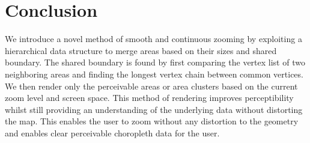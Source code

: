 
\section{Conclusion}
We introduce a novel method of smooth and continuous zooming by exploiting a hierarchical data structure to merge areas based on their sizes and shared boundary. The shared boundary is found by first comparing the vertex list of two neighboring areas and finding the longest vertex chain between common vertices. We then render only the perceivable areas or area clusters based on the current zoom level and screen space. This method of rendering improves perceptibility whilst still providing an understanding of the underlying data without distorting the map. This enables the user to zoom without any distortion to the geometry and enables clear perceivable choropleth data for the user. 

